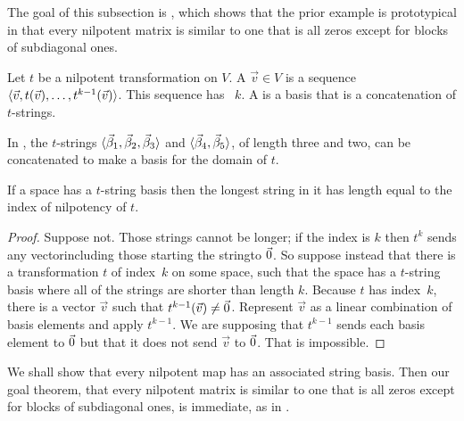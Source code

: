 The goal of this subsection is ,
which shows that the prior example is prototypical
in that every nilpotent matrix is similar to one that is all
zeros except for blocks of subdiagonal ones.

\begin{definition}
Let \( t \) be a nilpotent transformation on \( V \).
A 
\( \vec{v}\in V \) is a sequence
\( \langle\vec{v},t(\vec{v}),\ldots,t^{k-1}(\vec{v})\rangle \).
This sequence has ~$k$.
A 
is a basis that is a concatenation of \( t \)-strings.
\end{definition}

\begin{example}
In , the $t$-strings
$\langle\vec{\beta}_1,\vec{\beta}_2,\vec{\beta}_3\rangle$ and
$\langle\vec{\beta}_4,\vec{\beta}_5\rangle$, of length three and two,
can be concatenated to make a basis for the domain of $t$.
\end{example}

\begin{lemma}  \label{le:LongestTowerIsIndex}
If a space has a \( t \)-string basis then the longest string in it has 
length equal to the index of nilpotency of $t$.
\end{lemma}

\begin{proof}
Suppose not.
Those strings cannot be longer; if the index is
\( k \) then \( t^k \) sends any vector\Dash including those starting the
string\Dash to \( \vec{0} \).
So suppose instead that there is a transformation $t$ of index~$k$ 
on some space, such that the space has a $t$-string basis where 
all of the strings are shorter than length \( k \).
Because $t$ has index~$k$, there is a vector \( \vec{v} \) 
such that \( t^{k-1}(\vec{v})\neq\vec{0} \).
Represent $\vec{v}$ as a linear combination of basis elements 
and apply \( t^{k-1} \).
We are supposing that \( t^{k-1} \) sends each basis element to \( \vec{0} \)
but that it does not send \( \vec{v} \) to \( \vec{0} \).
That is impossible. 
\end{proof}

We shall show that every
nilpotent map has an associated string basis.
Then our goal theorem, that every
nilpotent matrix is similar to one that is
all zeros except for blocks of subdiagonal ones, is immediate,
as in .

